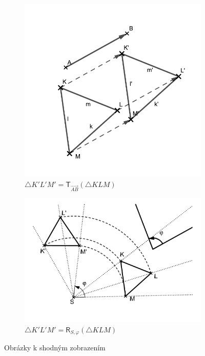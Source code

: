 \documentclass[12pt,a4wide,oneside,
headings]{report}
\begin{document}
\begin{figure}
\begin{subfigure}{0.42\textwidth}
\includegraphics[width=\textwidth]{souhrn/posunuti}
\caption{$\triangle K'L'M'=\mathsf{T}_{\overrightarrow{AB}}(\triangle KLM)$}
\label{fig:posun}
\end{subfigure}
\begin{subfigure}{0.58\textwidth}
\includegraphics[width=\textwidth]{souhrn/rotace}
\caption{$\triangle K'L'M'=\mathsf{R}_{S,\varphi}(\triangle KLM)$}
\label{fig:rotace}
\end{subfigure}
\caption{Obrázky k shodným zobrazením}
\end{figure}
\end{document}

